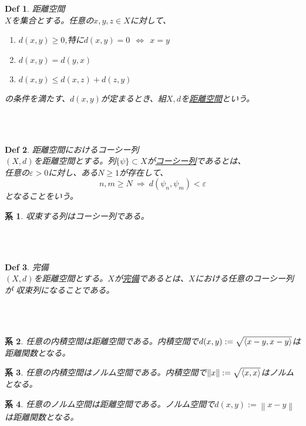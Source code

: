 \documentclass{jsarticle}
\newtheorem{df}{Def}[section]
\newtheorem{co}{系}[section]
\newcommand{\norm}[1]{\left\lVert#1\right\rVert}
\begin{document}
\newpage
\begin{df}距離空間\\
    \(X\)を集合とする。任意の\(x,y,z\in X\)に対して、
    \begin{enumerate}
        \item \(d(x,y)\geq0\),\hspace{10mm}特に\(d(x,y)=0~~\Longleftrightarrow~~x=y\)\\
        \item \(d(x,y)=d(y,x)\) \\
        \item \(d(x,y)\leq d(x,z) + d(z,y)\)
    \end{enumerate}
    の条件を満たす、\(d(x,y)\)が定まるとき、組\(X,d\)を\underline{距離空間}という。
\end{df}

~\\~
\begin{df}距離空間におけるコーシー列\\
    \(\left(X,d\right)\)を距離空間とする。列\(\{\psi\}\subset X\)が\underline{コーシー列}であるとは、\\
    任意の\(\varepsilon>0\)に対し、ある\(N\geq1\)が存在して、
    \begin{equation}
        n,m\geq N~\Longrightarrow~d(\psi_{n},\psi_{m})<\varepsilon
    \end{equation}
    となることをいう。\\
\end{df}
\begin{co}収束する列はコーシー列である。
\end{co}

~\\~
\begin{df}完備\\
    \(\left(X,d\right)\)を距離空間とする。\(X\)が\underline{完備}であるとは、\(X\)における任意のコーシー列が
    収束列になることである。
\end{df}

~\\~
\begin{co}任意の内積空間は距離空間である。内積空間で\(d(x,y):=\sqrt{\braket{x-y,x-y}}\)は距離関数となる。
\end{co}

\begin{co}任意の内積空間はノルム空間である。内積空間で\(\norm{x}:=\sqrt{\braket{x,x}}\)はノルムとなる。
\end{co}

\begin{co}任意のノルム空間は距離空間である。ノルム空間で\(d(x,y):=\norm{x-y}\)は距離関数となる。
\end{co}
\end{document}
